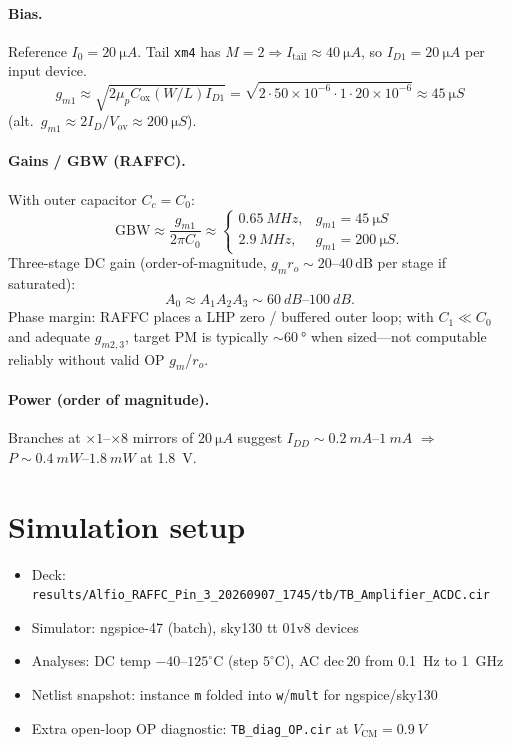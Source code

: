 \documentclass[11pt]{article}
\begin{document}
\paragraph{Bias.}
Reference $I_0{=}\SI{20}{\micro A}$. Tail \texttt{xm4} has $M{=}2\Rightarrow I_{\mathrm{tail}}\!\approx\!\SI{40}{\micro A}$, so $I_{D1}{=}\SI{20}{\micro A}$ per input device.
\[
g_{m1}\approx\sqrt{2\mu_p C_{\mathrm{ox}}(W/L)I_{D1}}
=\sqrt{2\cdot 50\times10^{-6}\cdot 1\cdot 20\times10^{-6}}
\approx\SI{45}{\micro S}
\]
(alt.\ $g_{m1}{\approx}2I_D/V_{\mathrm{ov}}{\approx}\SI{200}{\micro S}$).

\paragraph{Gains / GBW (RAFFC).}
With outer capacitor $C_c{=}C_0$:
\[
\mathrm{GBW}\approx\frac{g_{m1}}{2\pi C_0}
\approx
\begin{cases}
\SI{0.65}{MHz}, & g_{m1}{=}\SI{45}{\micro S}\\
\SI{2.9}{MHz}, & g_{m1}{=}\SI{200}{\micro S}.
\end{cases}
\]
Three-stage DC gain (order-of-magnitude, $g_m r_o\!\sim\!20$--$40\,\mathrm{dB}$ per stage if saturated):
\[
A_0\approx A_1 A_2 A_3 \sim \SI{60}{dB}\text{--}\SI{100}{dB}.
\]
Phase margin: RAFFC places a LHP zero / buffered outer loop; with $C_1{\ll}C_0$ and adequate $g_{m2,3}$, target PM is typically $\sim\SI{60}{\degree}$ when sized---not computable reliably without valid OP $g_m$/$r_o$.

\paragraph{Power (order of magnitude).}
Branches at $\times1$--$\times8$ mirrors of $\SI{20}{\micro A}$ suggest $I_{DD}\!\sim\!\SI{0.2}{mA}$--$\SI{1}{mA}$ $\Rightarrow$ $P\!\sim\!\SI{0.4}{mW}$--$\SI{1.8}{mW}$ at \SI{1.8}{V}.

\section{Simulation setup}
\begin{itemize}
  \item Deck: \texttt{results/Alfio\_RAFFC\_Pin\_3\_20260907\_1745/tb/TB\_Amplifier\_ACDC.cir}
  \item Simulator: ngspice-47 (batch), sky130 tt 01v8 devices
  \item Analyses: DC temp $-40$--$125^\circ\mathrm{C}$ (step $5^\circ\mathrm{C}$), AC $\mathrm{dec}\,20$ from \SI{0.1}{Hz} to \SI{1}{GHz}
  \item Netlist snapshot: instance \texttt{m} folded into \texttt{w}/\texttt{mult} for ngspice/sky130
  \item Extra open-loop OP diagnostic: \texttt{TB\_diag\_OP.cir} at $V_{\mathrm{CM}}{=}\SI{0.9}{V}$
\end{itemize}
\end{document}
